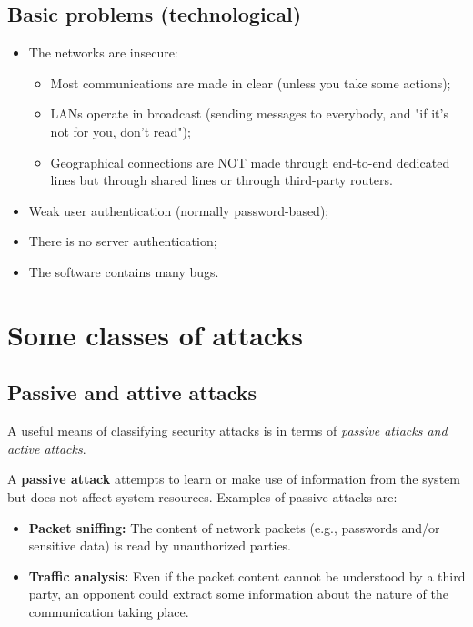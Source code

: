 \subsection*{Basic problems (technological)}
\begin{itemize}
  \item The networks are insecure:
        \begin{itemize}
          \item Most communications are made in clear (unless you take some actions);
          \item LANs operate in broadcast (sending messages to everybody, and "if it's not for you, don't read");
          \item Geographical connections are NOT made through end-to-end dedicated lines but through shared lines or through third-party routers.
        \end{itemize}
  \item Weak user authentication (normally password-based);
  \item There is no server authentication;
  \item The software contains many bugs.
\end{itemize}


\section{Some classes of attacks}

\subsection*{Passive and attive attacks}
A useful means of classifying security attacks is in terms of \emph{passive attacks and active attacks}.

A \textbf{passive attack} attempts to {learn or make use of information from the system but does not affect system resources}. Examples of passive attacks are:

\begin{itemize}
  \item \textbf{Packet sniffing:} The content of network packets (e.g., passwords and/or sensitive data) is read by unauthorized parties.
  \item \textbf{Traffic analysis:} Even if the packet content cannot be understood by a third party, an opponent could extract some information about the nature of the communication taking place.
\end{itemize}

